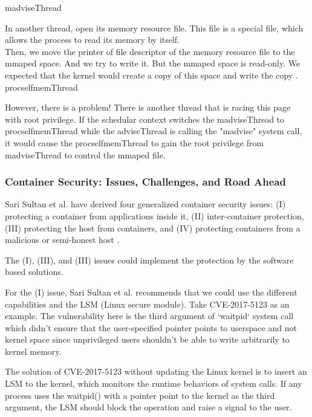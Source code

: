 \documentclass[12pt,a4paper]{article}
\begin{document}
\hypertarget{madvise}{madviseThread}


In another thread, open its memory resource file. This file is a special file, which allows
the process to read its memory by itself.\\

Then, we move the printer of file descriptor of the memory resource file to the mmaped
space. And we try to write it. But the mmaped space is read-only. We expected that the
kernel would create a copy of this space and write the copy \cite{root_exploit}.\\
\hypertarget{procself}{procselfmemThread}


However, there is a problem! There is another thread that is racing this page with root
privilege. If the schedular context switches the madviseThread to procselfmemThread while
the adviseThread is calling the "madvise" system call, it would cause the
procselfmemThread to gain the root privilege from madviseThread to control the mmaped file.

\subsubsection{Container Security: Issues, Challenges, and Road Ahead}
Sari Sultan et al. \cite{Road_Ahead} have derived four generalized container security issues:
(\RN{1}) protecting a container from applications inside it, (\RN{2}) inter-container
protection, (\RN{3}) protecting the host from containers, and (\RN{4}) protecting containers
from a malicious or semi-honest host \cite{Road_Ahead}.

The (\RN{1}), (\RN{3}), and (\RN{3}) issues could implement the protection by the software
based solutions.

For the (\RN{1}) issue, Sari Sultan et al. \cite{Road_Ahead} recommends that
we could use the different capabilities and the LSM (Linux secure module). Take
CVE-2017-5123 \cite{CVE-2017-5123} as an example. The vulnerability here is the third argument of
`waitpid` system call which didn't ensure that the user-specified pointer points to userspace
and not kernel space since unprivileged users shouldn’t be able to write arbitrarily
to kernel memory.

The solution of CVE-2017-5123 without updating the Linux kernel is to insert an
LSM to the kernel, which monitors the runtime behaviors of system calls. If any process
uses the waitpid() with a pointer point to the kernel as the third argument, the LSM should
block the operation and raise a signal to the user.
\end{document}
